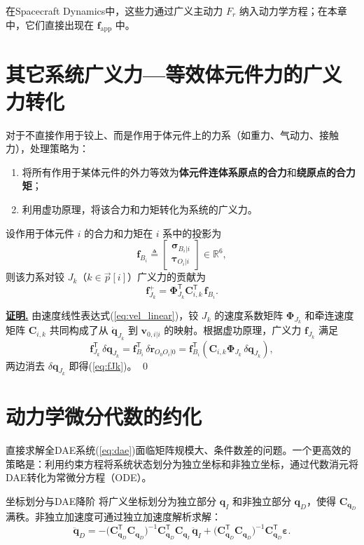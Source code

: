 \documentclass[10pt,a4paper]{book}
\theoremstyle{thmstyle}
\theoremstyle{defstyle}
\theoremstyle{prostyle}
\renewenvironment{proof}[1][证明]{\par{\kaishu \underline{\textbf{#1.}}} \;\fangsong}{\qed\par}
\newcommand{\T}{^{\mathsf{T}}}
\renewcommand{\vec}[1]{\bm{#1}}
\newcommand{\mat}[1]{\bm{#1}}
\newcommand{\R}{\mathbb{R}}
\begin{document}
在Spacecraft Dynamics中，这些力通过广义主动力 $F_r$ 纳入动力学方程；在本章中，它们直接出现在 $\vec{f}_{\mathrm{app}}$ 中。


\section{其它系统广义力---等效体元件力的广义力转化}

对于不直接作用于铰上、而是作用于体元件上的力系（如重力、气动力、接触力），处理策略为：

\begin{enumerate}
    \item 将所有作用于某体元件的外力等效为\textbf{体元件连体系原点的合力}和\textbf{绕原点的合力矩}；
    \item 利用虚功原理，将该合力和力矩转化为系统的广义力。
\end{enumerate}

设作用于体元件 $i$ 的合力和力矩在 $i$ 系中的投影为
\[
\vec{f}_{B_i} \triangleq \begin{bmatrix} \vec{\sigma}_{B_i|i} \\ \vec{\tau}_{O_i|i} \end{bmatrix}\in\R^6,
\]
则该力系对铰 $J_k$（$k\in\overrightarrow{p}[i]$）广义力的贡献为
\begin{equation}
\vec{f}_{J_k}^{+} = \mat{\Phi}_{J_k}\T\mat{C}_{i,k}\T\,\vec{f}_{B_i}.
\label{eq:fJk}
\end{equation}

\begin{proof}
由速度线性表达式(\ref{eq:vel_linear})，铰 $J_k$ 的速度系数矩阵 $\mat{\Phi}_{J_k}$ 和牵连速度矩阵 $\mat{C}_{i,k}$ 共同构成了从 $\dot{\vec{q}}_{J_k}$ 到 $\vec{v}_{0,i|i}$ 的映射。根据虚功原理，广义力 $\vec{f}_{J_k}$ 满足
\[
\vec{f}_{J_k}\T\,\delta\vec{q}_{J_k} = \vec{f}_{B_i}\T\,\delta\vec{r}_{O_0O_i|0}
= \vec{f}_{B_i}\T\left(\mat{C}_{i,k}\mat{\Phi}_{J_k}\,\delta\vec{q}_{J_k}\right),
\]
两边消去 $\delta\vec{q}_{J_k}$ 即得(\ref{eq:fJk})。
\end{proof}


\section{动力学微分代数的约化}
\label{sec:dae_reduction}

直接求解全DAE系统(\ref{eq:dae})面临矩阵规模大、条件数差的问题。一个更高效的策略是：利用约束方程将系统状态划分为独立坐标和非独立坐标，通过代数消元将DAE转化为常微分方程（ODE）。

\begin{myTheorem}{坐标划分与DAE降阶}
将广义坐标划分为独立部分 $\vec{q}_I$ 和非独立部分 $\vec{q}_D$，使得 $\mat{C}_{\vec{q}_D}$ 满秩。非独立加速度可通过独立加速度解析求解：
\begin{equation}
\ddot{\vec{q}}_D = -\bigl(\mat{C}_{\vec{q}_D}\T\mat{C}_{\vec{q}_D}\bigr)^{-1}
\mat{C}_{\vec{q}_D}\T\mat{C}_{\vec{q}_I}\,\ddot{\vec{q}}_I
+ \bigl(\mat{C}_{\vec{q}_D}\T\mat{C}_{\vec{q}_D}\bigr)^{-1}\mat{C}_{\vec{q}_D}\T\vec{\varepsilon}.
\label{eq:qddotD}
\end{equation}
\end{myTheorem}
\end{document}
